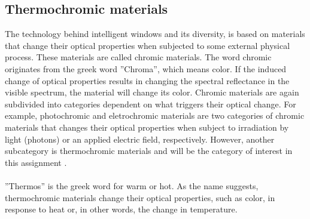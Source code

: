 \subsection{Thermochromic materials}
%
The technology behind intelligent windows and its diversity, is based on
materials that change their optical properties when subjected to some external physical process.
These materials are called chromic materials. 
The word chromic originates from the greek word ''Chroma'', which means color.
If the induced change of optical properties results in changing the spectral reflectance in
the visible spectrum, the material will change its color. 
Chromic materials are again subdivided into categories dependent on what triggers their optical change. 
For example, photochromic and eletrochromic materials are two categories of chromic materials 
that changes their optical properties when subject to irradiation by light (photons) or an applied 
electric field, respectively. However, another subcategory is thermochromic materials and will be the
category of interest in this assignment
\cite{BookMott1974}. %
\\
\\
''Thermos'' is the greek word for warm or hot. 
As the name suggests, thermochromic materials change their optical
properties, such as color, in response to heat or, in other words, the change in temperature.
